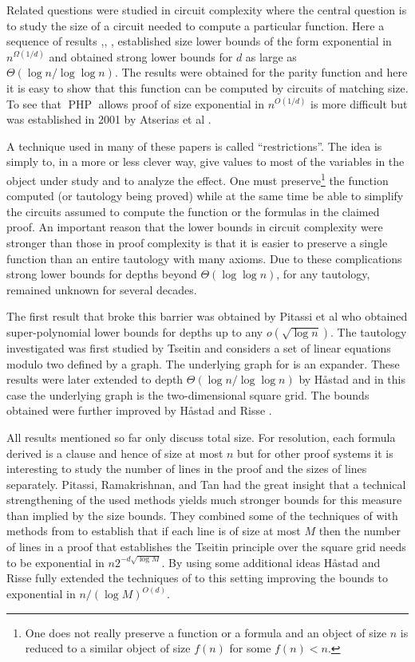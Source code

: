 \documentclass{article}\usepackage[a4paper,margin=20mm]{geometry}
\DeclareMathOperator{\PHP}{PHP}
\begin{document}
Related questions were studied in circuit complexity where the
central question is to study the size of a circuit needed
to compute a particular function.  Here a sequence of
results \cite{fss},\cite{sipser}, \cite{yao}, \cite{jhswitch}
established size lower bounds of
the form exponential in $n^{\Omega (1/d)}$ and obtained
strong lower bounds for $d$
as large as $\Theta (\log n / \log {\log n})$.  
The results were obtained for the parity function and
here it is easy to show that this function can be computed
by circuits of matching size.  To see that $\PHP$ 
allows proof of size exponential in $n^{O(1/d)}$ is
more difficult but was established in 2001 by
Atserias et al \cite{agg01}.

A technique used in many of these papers is called ``restrictions''.
The idea is simply to, in a more or less
clever way, give values to most of the
variables in the object under study and to analyze
the effect.  One must preserve\footnote{One does not really
preserve a function or a formula and an object of size $n$ is
reduced to a similar object of size $f(n)$ for some $f(n) < n$.}
the function computed (or tautology being proved) while 
at the same time be able to
simplify the circuits assumed to compute the function or
the formulas in the claimed proof.
An important reason that the lower bounds in circuit complexity
were stronger than those in proof complexity
is that it is easier to preserve a single function
than an entire tautology with many axioms.
Due to these complications strong lower bounds for
depths beyond $\Theta( \log {\log n})$, for any tautology, remained unknown for 
several decades.  

The first result that broke this barrier was 
obtained by Pitassi et al \cite{pitassi16frege}
who obtained super-polynomial lower bounds for
depths up to any $o(\sqrt {\log n})$.
The tautology investigated was first studied by Tseitin \cite{tseitin}
and considers a set of linear equations modulo two defined
by a graph.  The underlying graph for
\cite{pitassi16frege} is an expander.  These results were
later extended to depth $\Theta( \log n / \log {\log n})$
by H{\aa}stad \cite{jhtseitin}
and in this case the underlying graph is the two-dimensional square grid.
The bounds obtained were further improved by 
H{\aa}stad and Risse \cite{jhkr}.

All results mentioned so far only discuss total size.  For
resolution, each formula derived is a clause and hence of size 
at most $n$ but
for other proof systems it is interesting to study
the number of lines in the proof and the sizes of lines
separately.  Pitassi, Ramakrishnan,
and Tan \cite{PRT21} had the great insight that a technical
strengthening of the used methods yields much
stronger bounds for this measure than implied by the
size bounds.  They combined some of the techniques
of \cite{jhtseitin} with methods from \cite{pitassi16frege}
to establish that if each line is of size at most $M$ then
the number of lines in a proof that establishes the Tseitin
principle over the square grid needs to be exponential in $n2^{-d \sqrt {\log M}}$.
By using some additional ideas H{\aa}stad and Risse \cite{jhkr}
fully extended the techniques of \cite{jhtseitin}
to this setting improving the bounds to exponential
in $n/(\log M)^{O(d)}$.
\end{document}
